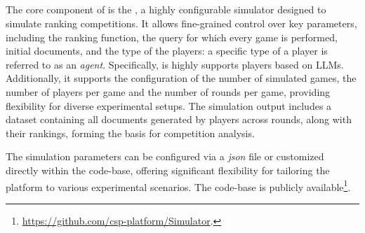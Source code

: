 \subsection{{\platformName} {\platform}}
The core component of {\platformName} is the {\platformName} {\platform}, a highly configurable simulator designed to simulate ranking competitions.
It allows fine-grained control over key parameters, including the ranking function, the query for which every game is performed, initial documents, and the type of the players: a specific type of a player is referred to as an {\em agent}. Specifically, \platformName{} is highly supports players based on LLMs. Additionally, it supports the configuration of the number of simulated games, the number of players per game and the number of rounds per game, providing flexibility for diverse experimental setups. The simulation output includes a dataset containing all documents generated by players across rounds, along with their rankings, forming the basis for competition analysis.





The simulation parameters can be configured via a \textit{json} file or customized directly within the {\platformName} {\platform} code-base, offering significant flexibility for tailoring the platform to various experimental scenarios. The code-base is publicly available\footnote{\url{https://github.com/csp-platform/Simulator}.}.

